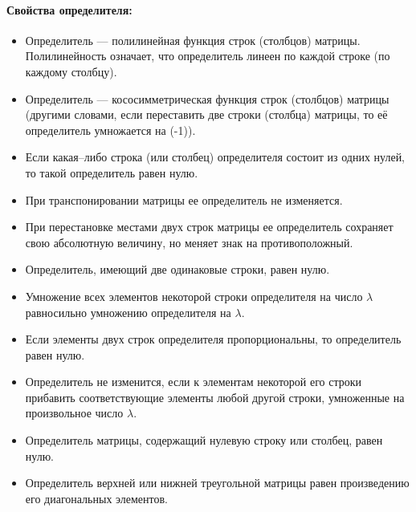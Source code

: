 \documentclass[a4paper,14pt]{article}
\begin{document}
\paragraph{Свойства определителя:}
\begin{itemize}
	\item Определитель — полилинейная функция строк (столбцов) матрицы. Полилинейность означает, что определитель линеен по каждой строке (по каждому столбцу).
	\item Определитель — кососимметрическая функция строк (столбцов) матрицы (другими словами, если переставить две строки (столбца) матрицы, то её определитель умножается на (-1)).
	\item Если какая–либо строка (или столбец) определителя состоит из одних нулей, то такой определитель равен нулю.
	\item При транспонировании матрицы ее определитель не изменяется.
	\item При перестановке местами двух строк матрицы ее определитель сохраняет свою абсолютную величину, но меняет знак на противоположный.
	\item Определитель, имеющий две одинаковые строки, равен нулю.
	\item Умножение всех элементов некоторой строки определителя на число $\lambda$ равносильно умножению определителя на $\lambda$.
	\item Если элементы двух строк определителя пропорциональны, то определитель равен нулю.
	\item Определитель не изменится, если к элементам некоторой его строки прибавить соответствующие элементы любой другой строки, умноженные на произвольное число $\lambda$.
	\item Определитель матрицы, содержащий нулевую строку или столбец, равен нулю.
	\item Определитель верхней или нижней треугольной матрицы равен произведению его диагональных элементов.
\end{itemize}
\end{document}
